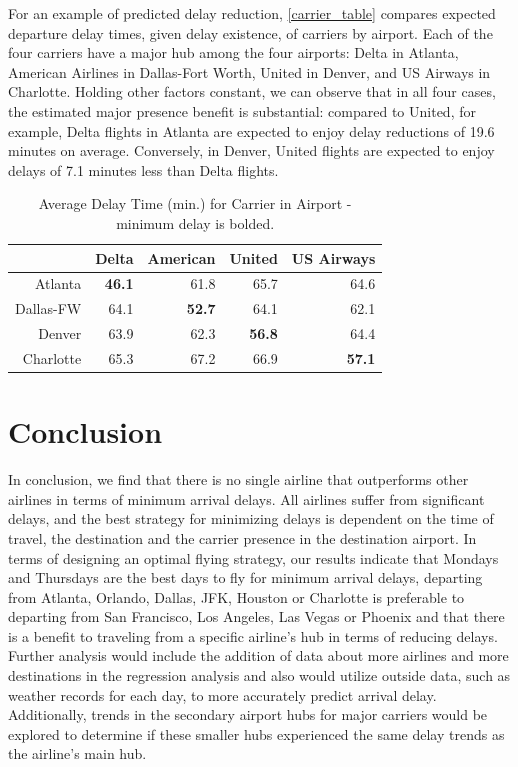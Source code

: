 \documentclass{article} %
\begin{document}
For an example of predicted delay reduction, \autoref{carrier_table} compares expected departure delay times, given delay existence, of carriers by airport. Each of the four carriers have a major hub among the four airports: Delta in Atlanta, American Airlines in Dallas-Fort Worth, United in Denver, and US Airways in Charlotte. Holding other factors constant, we can observe that in all four cases, the estimated major presence benefit is substantial: compared to United, for example, Delta flights in Atlanta are expected to enjoy delay reductions of 19.6 minutes on average. Conversely, in Denver, United flights are expected to enjoy delays of 7.1 minutes less than Delta flights. 

\begin{table}[ht]
\centering
\begin{tabular}{rrrrr}
  \hline
 & Delta & American & United & US Airways \\ 
  \hline
Atlanta & \bf{46.1} & 61.8 & 65.7 & 64.6 \\ 
  Dallas-FW & 64.1 & \bf{52.7} & 64.1 & 62.1 \\ 
  Denver & 63.9 & 62.3 & \bf{56.8} & 64.4 \\
  Charlotte & 65.3 & 67.2 & 66.9 & \bf{57.1} \\ 
   \hline
\end{tabular}
\caption{Average Delay Time (min.) for Carrier in Airport - minimum delay is bolded.\label{carrier_table}
}

\end{table}


\section{Conclusion}
\label{headings}


In conclusion, we find that there is no single airline that outperforms other airlines in terms of minimum arrival delays. All airlines suffer from significant delays, and the best strategy for minimizing delays is dependent on the time of travel, the destination and the carrier presence in the destination airport. In terms of designing an optimal flying strategy, our results indicate that Mondays and Thursdays are the best days to fly for minimum arrival delays, departing from Atlanta, Orlando, Dallas, JFK, Houston or Charlotte is preferable to departing from San Francisco, Los Angeles, Las Vegas or Phoenix and that there is a benefit to traveling from a specific airline's hub in terms of reducing delays. Further analysis would include the addition of data about more airlines and more destinations in the regression analysis and also would utilize outside data, such as weather records for each day, to more accurately predict arrival delay. Additionally, trends in the secondary airport hubs for major carriers would be explored to determine if these smaller hubs experienced the same delay trends as the airline's main hub.  
\end{document}

